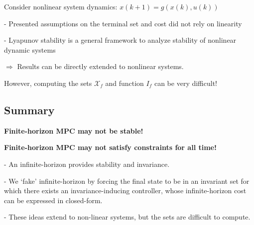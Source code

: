 Consider nonlinear system dynamics: $x(k+1) = g(x(k), u(k))$


- Presented assumptions on the terminal set and cost
did not rely on linearity

- Lyapunov stability is a general framework to analyze
stability of nonlinear dynamic systems

$\Rightarrow$ Results can be directly extended to nonlinear systems.

However, computing the sets $\mathcal{X}_f$
and function $I_f$ can be very difficult!

\subsection{Summary}

\textbf{Finite-horizon MPC may not be stable!}

\textbf{Finite-horizon MPC may not satisfy constraints for all time!}

- An infinite-horizon provides stability and invariance.

- We ‘fake’ infinite-horizon by forcing the final state to be in an invariant
set for which there exists an invariance-inducing controller, whose
infinite-horizon cost can be expressed in closed-form.

- These ideas extend to non-linear systems,
but the sets are difficult to compute.
